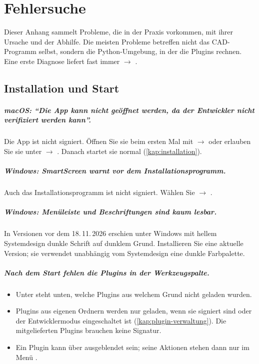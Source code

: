 \chapter{Fehlersuche}\label{kap:fehlersuche}

Dieser Anhang sammelt Probleme, die in der Praxis vorkommen, mit ihrer Ursache und der
Abhilfe. Die meisten Probleme betreffen nicht das CAD-Programm selbst, sondern die
Python-Umgebung, in der die Plugins rechnen. Eine erste Diagnose liefert fast immer
 $\to$ .

\section{Installation und Start}

\paragraph{macOS: \enquote{Die App kann nicht geöffnet werden, da der Entwickler nicht
verifiziert werden kann}.}
Die App ist nicht signiert. Öffnen Sie sie beim ersten Mal mit  $\to$
 oder erlauben Sie sie unter  $\to$ . Danach startet sie normal (\autoref{kap:installation}).

\paragraph{Windows: SmartScreen warnt vor dem Installationsprogramm.}
Auch das Installationsprogramm ist nicht signiert. Wählen Sie 
$\to$ .

\paragraph{Windows: Menüleiste und Beschriftungen sind kaum lesbar.}
In Versionen vor dem 18.\,11.\,2026 erschien unter Windows mit hellem Systemdesign dunkle
Schrift auf dunklem Grund. Installieren Sie eine aktuelle Version; sie verwendet unabhängig
vom Systemdesign eine dunkle Farbpalette.

\paragraph{Nach dem Start fehlen die Plugins in der Werkzeugspalte.}
\begin{itemize}
  \item Unter  steht unten, welche Plugins aus welchem Grund nicht
    geladen wurden.
  \item Plugins aus eigenen Ordnern werden nur geladen, wenn sie signiert sind oder der
    Entwicklermodus eingeschaltet ist (\autoref{kap:plugin-verwaltung}). Die mitgelieferten
    Plugins brauchen keine Signatur.
  \item Ein Plugin kann über  ausgeblendet sein; seine
    Aktionen stehen dann nur im Menü .
\end{itemize}

